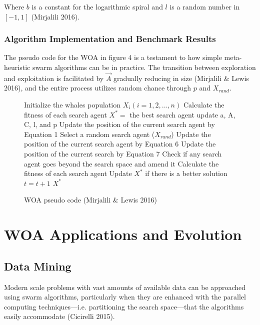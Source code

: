 \documentclass[11pt]{article}
\begin{document}
Where $b$ is a constant for the logarithmic spiral and $l$ is a random number in $[-1, 1]$ (Mirjalili 2016).

\subsubsection*{Algorithm Implementation and Benchmark Results}
The pseudo code for the WOA in figure 4 is a testament to how simple meta-heuristic swarm algorithms can be in practice.
The transition between exploration and exploitation is facilitated by $\vec{A}$ gradually reducing in size (Mirjalili \& Lewis 2016), and the entire process utilizes random chance through $p$ and $X_{rand}$.

\begin{wrapfigure}{R}{0.55\textwidth}
	\caption{WOA pseudo code (Mirjalili \& Lewis 2016)}
	\begin{minipage}{0.55\textwidth}
		\begin{algorithm}[H]
			\begin{algorithmic}
				\STATE Initialize the whales population $X_i(i = 1,2, \dots, n)$
				\STATE Calculate the fitness of each search agent
				\STATE $X^* = $ the best search agent
						\STATE update a, A, C, l, and p
								\STATE Update the position of the current search agent by Equation 1
							\ELSE
								\STATE Select a random search agent ($X_{rand}$)
								\STATE Update the position of the current search agent by Equation 6
							\ENDIF
						\ELSE
							\STATE Update the position of the current search by Equation 7
						\ENDIF
					\ENDFOR
					\STATE Check if any search agent goes beyond the search space and amend it
					\STATE Calculate the fitness of each search agent
					\STATE Update $X^*$ if there is a better solution
					\STATE $t = t+1$
				\ENDWHILE
				\STATE \RETURN $X^*$ 
			\end{algorithmic}
		\end{algorithm}
	\end{minipage}
\end{wrapfigure}

\section*{WOA Applications and Evolution}
\subsection*{Data Mining}
Modern scale problems with vast amounts of available data can be approached using swarm algorithms, particularly when they are enhanced with the parallel computing techniques---i.e. partitioning the search space---that the algorithms easily accommodate (Cicirelli 2015).
\end{document}
